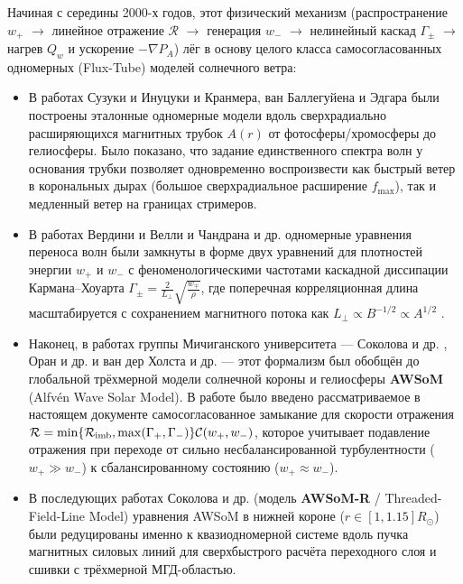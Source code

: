 \documentclass[11pt,a4paper]{article}
\begin{document}
Начиная с середины 2000-х годов, этот физический механизм (распространение $w_+$ $\to$ линейное отражение $\mathcal{R}$ $\to$ генерация $w_-$ $\to$ нелинейный каскад $\Gamma_\pm$ $\to$ нагрев $Q_w$ и ускорение $-\nabla P_A$) лёг в основу целого класса самосогласованных одномерных (Flux-Tube) моделей солнечного ветра:
\begin{itemize}
\item В работах Сузуки и Инуцуки \cite{SuzukiInutsuka2005} и Кранмера, ван Баллегуйена и Эдгара \cite{Cranmer2007} были построены эталонные одномерные модели вдоль сверхрадиально расширяющихся магнитных трубок $A(r)$ от фотосферы/хромосферы до гелиосферы. Было показано, что задание единственного спектра волн у основания трубки позволяет одновременно воспроизвести как быстрый ветер в корональных дырах (большое сверхрадиальное расширение $f_{\max}$), так и медленный ветер на границах стримеров.
\item В работах Вердини и Велли \cite{VerdiniVelli2007,Verdini2010} и Чандрана и др. \cite{Chandran2009,Chandran2011} одномерные уравнения переноса волн были замкнуты в форме двух уравнений для плотностей энергии $w_+$ и $w_-$ с феноменологическими частотами каскадной диссипации Кармана--Хоуарта $\Gamma_\pm = \frac{2}{L_\perp}\sqrt{\frac{w_\mp}{\rho}}$, где поперечная корреляционная длина масштабируется с сохранением магнитного потока как $L_\perp \propto B^{-1/2} \propto A^{1/2}$ \cite{Hollweg1986}.
\item Наконец, в работах группы Мичиганского университета --- Соколова и др. \cite{Sokolov2013}, Оран и др. \cite{Oran2013} и ван дер Холста и др. \cite{vanderHolst2014} --- этот формализм был обобщён до глобальной трёхмерной модели солнечной короны и гелиосферы \textbf{AWSoM} (Alfv\'en Wave Solar Model). В работе \cite{vanderHolst2014} было введено рассматриваемое в настоящем документе самосогласованное замыкание для скорости отражения $\mathcal{R} = \min\{\mathcal{R}_{\rm imb}, \max(\Gamma_+,\Gamma_-)\}\mathcal{C}(w_+, w_-)$, которое учитывает подавление отражения при переходе от сильно несбалансированной турбулентности ($w_+ \gg w_-$) к сбалансированному состоянию ($w_+ \approx w_-$).
\item В последующих работах Соколова и др. \cite{Sokolov2016,Sokolov2021} (модель \textbf{AWSoM-R} / Threaded-Field-Line Model) уравнения AWSoM в нижней короне ($r \in [1, 1.15] R_\odot$) были редуцированы именно к квазиодномерной системе вдоль пучка магнитных силовых линий для сверхбыстрого расчёта переходного слоя и сшивки с трёхмерной МГД-областью.
\end{itemize}
\end{document}
